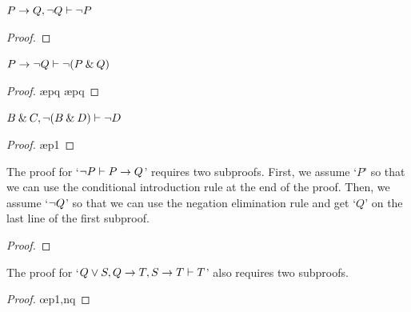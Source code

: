\begin{earg}

\item $P \rightarrow Q, {\neg} Q \vdash {\neg} P$

\begin{proof}
	 \pr{}
	 \pr{}	
	\open
		 \as{}
		 
		 
	\close
	 
\end{proof}
\medskip



\item $P \rightarrow {\neg} Q \vdash {\neg}(P \mathbin{\&} Q)$

\begin{proof}
	 \pr{}	
	\open
		 \as{}
		 \ae{pq}
		 
		 \ae{pq}
	\close
	 
\end{proof}
\medskip

\item $B \mathbin{\&} C, {\neg}(B \mathbin{\&} D) \vdash {\neg} D$

\begin{proof}
	 \pr{}	
	 \pr{}
	\open
		 \as{}
		 \ae{p1}
		 
		 
	\close
	 
\end{proof}
\medskip

\filbreak

\item The proof for `${\neg} P \vdash P \rightarrow Q$' requires two subproofs. First, we assume `$P$' so that we can use the conditional introduction rule at the end of the proof. Then, we assume `${\neg} Q$' so that we can use the negation elimination rule and get `$Q$' on the last line of the first subproof.

\begin{proof}
	 \pr{}	
	\open
			\as{}
		\open
			 \as{}
			 
			 
		\close
		 
	\close
	 
\end{proof}
\medskip

\item The proof for  `$Q \vee S, Q \rightarrow T, S \rightarrow T \vdash T$' also requires two subproofs. 

\begin{proof}
	 \pr{}
	 \pr{}
	 \pr{}
	\open
		 \as{}
			\open
				 \as{}
				 \oe{p1,nq}
				 
				 
			\close
		 
		 
		 
	\close
	 
\end{proof}
\medskip

\end{earg}



